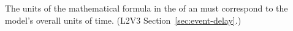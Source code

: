 The units of the mathematical formula in the  of an \Event
must correspond to the model's overall units of time.  (L2V3
Section~\ref{sec:event-delay}.)
